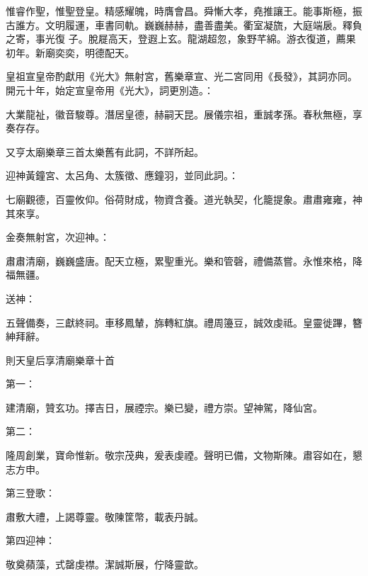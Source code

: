 \begin{pinyinscope}
 惟睿作聖，惟聖登皇。精感耀魄，時膺會昌。舜慚大孝，堯推讓王。能事斯極，振古誰方。文明履運，車書同軌。巍巍赫赫，盡善盡美。衢室凝旒，大庭端扆。釋負之寄，事光復
 子。脫屣高天，登遐上玄。龍湖超忽，象野芊綿。游衣復道，薦果初年。新廟奕奕，明德配天。



 皇祖宣皇帝酌獻用《光大》無射宮，舊樂章宣、光二宮同用《長發》，其詞亦同。開元十年，始定宣皇帝用《光大》，詞更別造。：



 大業龍祉，徽音駿尊。潛居皇德，赫嗣天昆。展儀宗祖，重誠孝孫。春秋無極，享奏存存。



 又亨太廟樂章三首太樂舊有此詞，不詳所起。



 迎神黃鐘宮、太呂角、太簇徵、應鐘羽，並同此詞。：



 七廟觀德，百靈攸仰。俗荷財成，物資含養。道光執契，化籠提象。肅肅雍雍，神其來享。



 金奏無射宮，次迎神。：



 肅肅清廟，巍巍盛唐。配天立極，累聖重光。樂和管磬，禮備蒸嘗。永惟來格，降福無疆。



 送神：



 五聲備奏，三獻終祠。車移鳳輦，旆轉紅旗。禮周籩豆，誠效虔祗。皇靈徙蹕，簪紳拜辭。



 則天皇后享清廟樂章十首



 第一：



 建清廟，贊玄功。擇吉日，展禋宗。樂已變，禮方崇。望神駕，降仙宮。



 第二：



 隆周創業，寶命惟新。敬宗茂典，爰表虔禋。聲明已備，文物斯陳。肅容如在，懇志方申。



 第三登歌：



 肅敷大禮，上謁尊靈。敬陳筐幣，載表丹誠。



 第四迎神：



 敬奠蘋藻，式罄虔襟。潔誠斯展，佇降靈歆。




\end{pinyinscope}
